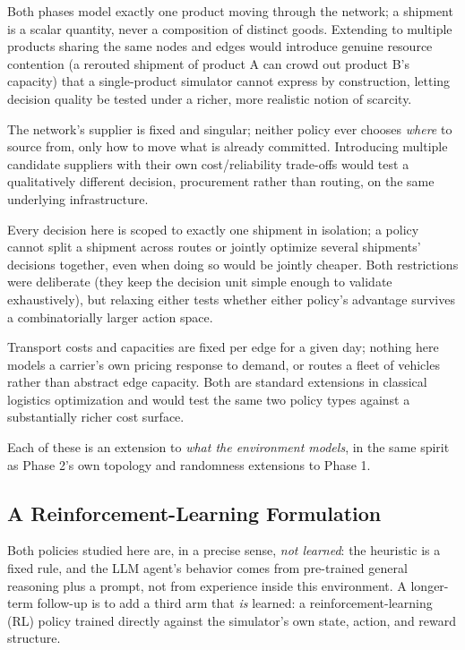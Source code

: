 \documentclass[10pt,twocolumn]{article}
\begin{document}
\begin{description}[leftmargin=1.2em,style=unboxed]
\item[Multiple products.] Both phases model exactly one product moving through the network; a shipment is a scalar quantity, never a composition of distinct goods. Extending to multiple products sharing the same nodes and edges would introduce genuine resource contention (a rerouted shipment of product A can crowd out product B's capacity) that a single-product simulator cannot express by construction, letting decision quality be tested under a richer, more realistic notion of scarcity.
\item[Supplier selection and procurement.] The network's supplier is fixed and singular; neither policy ever chooses \emph{where} to source from, only how to move what is already committed. Introducing multiple candidate suppliers with their own cost/reliability trade-offs would test a qualitatively different decision, procurement rather than routing, on the same underlying infrastructure.
\item[Shipment splitting and joint multi-shipment optimization.] Every decision here is scoped to exactly one shipment in isolation; a policy cannot split a shipment across routes or jointly optimize several shipments' decisions together, even when doing so would be jointly cheaper. Both restrictions were deliberate (they keep the decision unit simple enough to validate exhaustively), but relaxing either tests whether either policy's advantage survives a combinatorially larger action space.
\item[Dynamic pricing and fleet-level routing.] Transport costs and capacities are fixed per edge for a given day; nothing here models a carrier's own pricing response to demand, or routes a fleet of vehicles rather than abstract edge capacity. Both are standard extensions in classical logistics optimization and would test the same two policy types against a substantially richer cost surface.
\end{description}

Each of these is an extension to \emph{what the environment models}, in the same spirit as Phase 2's own topology and randomness extensions to Phase 1.

\subsection{A Reinforcement-Learning Formulation}
\label{sec:rl}
Both policies studied here are, in a precise sense, \emph{not learned}: the heuristic is a fixed rule, and the LLM agent's behavior comes from pre-trained general reasoning plus a prompt, not from experience inside this environment. A longer-term follow-up is to add a third arm that \emph{is} learned: a reinforcement-learning (RL) policy trained directly against the simulator's own state, action, and reward structure.
\end{document}
